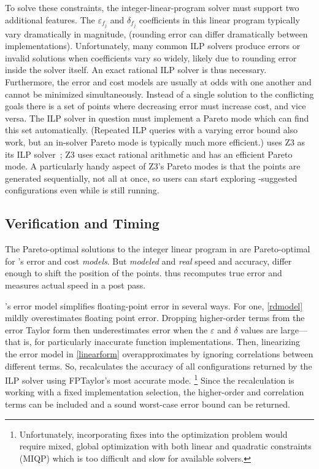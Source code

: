 \documentclass[paper.tex]{subfiles}
\begin{document}
To solve these constraints,
  the integer-linear-program solver
  must support two additional features.
The $\varepsilon_{f_j}$ and $\delta_{f_j}$ coefficients
  in this linear program
  typically vary dramatically in magnitude,
  (rounding error can differ dramatically
  between implementations).
Unfortunately, many common ILP solvers
  produce errors or invalid solutions
  when coefficients vary so widely,
  likely due to rounding error inside the solver itself.
An exact rational ILP solver is thus necessary.
Furthermore, the error and cost models
  are usually at odds with one another and
  cannot be minimized simultaneously.
Instead of a single solution to the conflicting goals
  there is a set of points where decreasing error must increase cost,
  and vice versa.
The ILP solver in question must implement
  a Pareto mode which can find this set automatically.
(Repeated ILP queries with a varying error bound also work,
  but an in-solver Pareto mode is typically much more efficient.)
\name uses Z3 as its ILP solver~\cite{z3};
  Z3 uses exact rational arithmetic
  and has an efficient Pareto mode.
A particularly handy aspect of Z3's Pareto modes
  is that the points are generated sequentially, not all at once,
  so users can start exploring \name-suggested configurations
  even while \name is still running.

\subsection{Verification and Timing}

The Pareto-optimal solutions
  to the integer linear program in 
  are Pareto-optimal for \name's error and cost \textit{models}.
But \textit{modeled} and \textit{real} speed and accuracy,
  differ enough to shift the position of the points.
\name thus recomputes true error and measures actual speed in a post pass.

\name's error model simplifies floating-point error in several ways.
For one, \cref{rdmodel} mildly overestimates floating point error.
Dropping higher-order terms from the error Taylor form
  then underestimates error
  when the $\varepsilon$ and $\delta$ values are large---%
  that is, for particularly inaccurate function implementations.
Then, linearizing the error model in \cref{linearform}
  overapproximates by ignoring correlations between different terms.
So, \name recalculates the accuracy
  of all configurations returned by the ILP solver
  using FPTaylor's most accurate  mode.%
\footnote{
Unfortunately, incorporating fixes into the optimization problem
  would require mixed, global optimization
  with both linear and quadratic constraints (MIQP)
  which is too difficult and slow for available solvers.
}
Since the recalculation is working with a fixed implementation selection,
  the higher-order and correlation terms can be included
  and a sound worst-case error bound can be returned.
\end{document}
